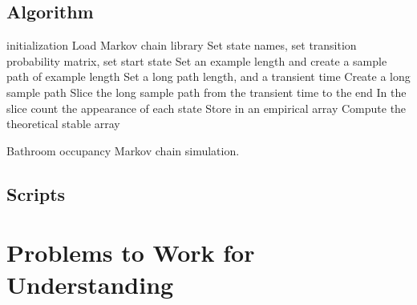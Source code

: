 \documentclass[12pt]{article}
\begin{document}
\subsection*{Algorithm}

\begin{algorithm}[H]
    \SetAlgoLined {}

    initialization\; Load Markov chain library\; Set state names, set
    transition probability matrix, set start state\; Set an example
    length and create a sample path of example length\; Set a long path
    length, and a transient time\; Create a long sample path\; Slice the
    long sample path from the transient time to the end\; In the slice
    count the appearance of each state\; Store in an empirical array\;
    Compute the theoretical stable array\;

    \caption{Bathroom occupancy Markov chain simulation.}
\end{algorithm}

\subsection*{Scripts}



\hr

\section*{Problems to Work for Understanding}

\renewcommand{\theexerciseseries}{}
\renewcommand{\theexercise}{\arabic{exercise}}
\end{document}
